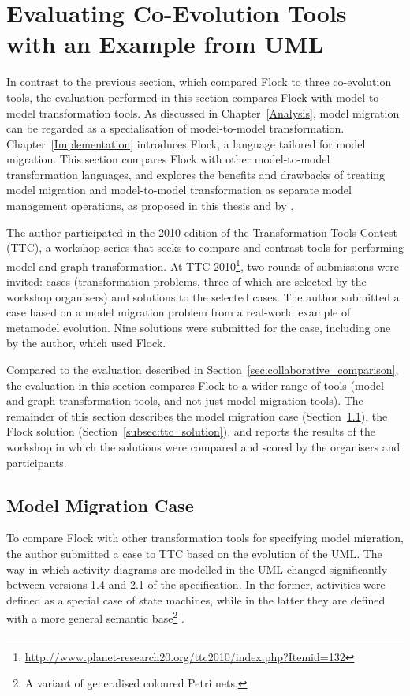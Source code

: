 \section[Evaluating Co-Evolution Tools with an Example from UML][Evaluating Co-Evolution Tools (UML)]{Evaluating Co-Evolution Tools with an Example from UML}
\label{sec:ttc}
In contrast to the previous section, which compared Flock to three co-evolution tools, the evaluation performed in this section compares Flock with model-to-model transformation tools. As discussed in Chapter~\ref{Analysis}, model migration can be regarded as a specialisation of model-to-model transformation. Chapter~\ref{Implementation} introduces Flock, a language tailored for model migration. This section compares Flock with other model-to-model transformation languages, and explores the benefits and drawbacks of treating model migration and model-to-model transformation as separate model management operations, as proposed in this thesis and by \cite{sprinkle03thesis}.

The author participated in the 2010 edition of the Transformation Tools Contest (TTC), a workshop series that seeks to compare and contrast tools for performing model and graph transformation. At TTC 2010\footnote{\url{http://www.planet-research20.org/ttc2010/index.php?Itemid=132}}, two rounds of submissions were invited: cases (transformation problems, three of which are selected by the workshop organisers) and solutions to the selected cases. The author submitted a case based on a model migration problem from a real-world example of metamodel evolution. Nine solutions were submitted for the case, including one by the author, which used Flock.

Compared to the evaluation described in Section~\ref{sec:collaborative_comparison}, the evaluation in this section compares Flock to a wider range of tools (model and graph transformation tools, and not just model migration tools). The remainder of this section describes the model migration case (Section~\ref{subsec:ttc_case}), the Flock solution (Section~\ref{subsec:ttc_solution}), and reports the results of the workshop in which the solutions were compared and scored by the organisers and participants.


\subsection{Model Migration Case}
\label{subsec:ttc_case}
To compare Flock with other transformation tools for specifying model migration, the author submitted a case to TTC based on the evolution of the UML. The way in which activity diagrams are modelled in the UML changed significantly between versions 1.4 and 2.1 of the specification. In the former, activities were defined as a special case of state machines, while in the latter they are defined with a more general semantic base\footnote{A variant of generalised coloured Petri nets.} \cite{selic05uml2}.

